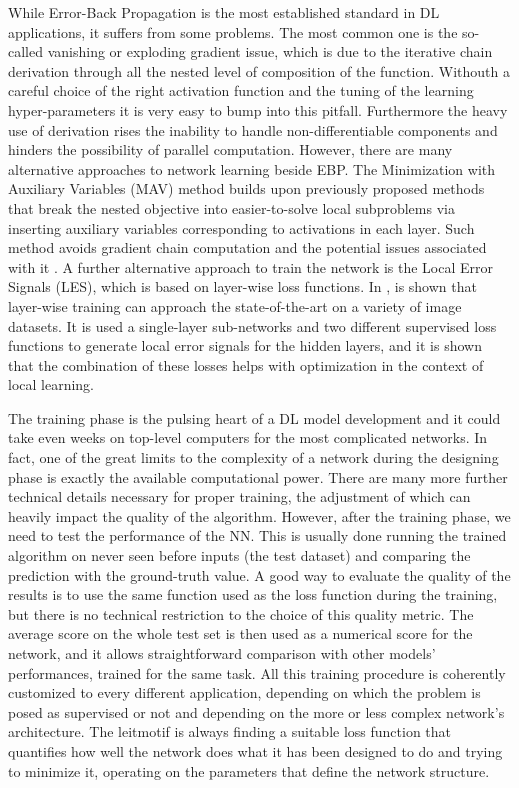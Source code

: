 While Error-Back Propagation is the most established standard in DL applications, it suffers from some problems. The most common one is the so-called vanishing or exploding gradient issue, which is due to the iterative chain derivation through all the nested level of composition of the function. Withouth a careful choice of the right activation function and the tuning of the learning hyper-parameters it is very easy to bump into this pitfall. Furthermore the heavy use of derivation rises the inability to handle non-differentiable components and hinders the possibility of parallel computation. However, there are many alternative approaches to network learning beside EBP. The Minimization with Auxiliary Variables (MAV) method builds upon previously proposed methods that break the nested objective into easier-to-solve local subproblems via inserting auxiliary variables corresponding to activations in each layer. Such method avoids gradient chain computation and the potential issues associated with it \cite{1806.09077}. A further alternative approach to train the network is the Local Error Signals (LES), which is based on layer-wise loss functions. In \cite{1901.06656}, is shown that layer-wise training can approach the state-of-the-art on a variety of image datasets. It is used a single-layer sub-networks and two different supervised loss functions to generate local error signals for the hidden layers, and it is shown that the combination of these losses helps with optimization in the context of local learning.

The training phase is the pulsing heart of a DL model development and it could take even weeks on top-level computers for the most complicated networks. In fact, one of the great limits to the complexity of a network during the designing phase is exactly the available computational power. There are many more further technical details necessary for proper training, the adjustment of which can heavily impact the quality of the algorithm. However, after the training phase, we need to test the performance of the NN. This is usually done running the trained algorithm on never seen before inputs (the test dataset) and comparing the prediction with the ground-truth value. A good way to evaluate the quality of the results is to use the same function used as the loss function during the training, but there is no technical restriction to the choice of this quality metric. The average score on the whole test set is then used as a numerical score for the network, and it allows straightforward comparison with other models' performances, trained for the same task. All this training procedure is coherently customized to every different application, depending on which the problem is posed as supervised or not and depending on the more or less complex network's architecture. The leitmotif is always finding a suitable loss function that quantifies how well the network does what it has been designed to do and trying to minimize it, operating on the parameters that define the network structure.

